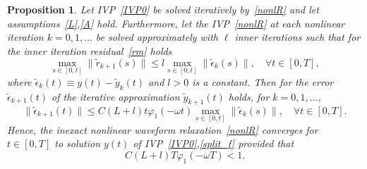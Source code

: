 \documentclass[sn-aps]{sn-jnl}
\theoremstyle{thmstyleone}%
\newtheorem{proposition}[theorem]{Proposition}%
\theoremstyle{thmstyletwo}%
\theoremstyle{thmstylethree}%
\newcommand{\leqs}{\leqslant}
\begin{document}
\begin{proposition}
\label{prop4}
Let IVP~\eqref{IVP0} be solved iteratively by~\eqref{nonlR} and let 
assumptions~\eqref{L},\eqref{A} hold.
Furthermore, let the IVP~\eqref{nonlR} at each nonlinear iteration $k=0,1,\dots$
be solved approximately with $\ell$ inner iterations such that for the inner iteration
residual~\eqref{rm} holds 
\begin{equation}
\label{rm_cond}
\max_{s\in[0,t]} \|\tilde{r}_{k+1}(s)\|\leqs
l \max_{s\in[0,t]} \|\tilde{\epsilon}_k(s)\|, \quad \forall t\in[0,T],
\end{equation} 
where $\tilde{\epsilon}_{k}(t)\equiv y(t) - \tilde{y}_{k}(t)$ and $l>0$ is a constant.
Then for the error $\tilde{\epsilon}_{k+1}(t)$  %
of the iterative approximation $\tilde{y}_{k+1}(t)$ holds, for $k=0,1,\dots$,
\begin{equation}
\label{est4}
\|\tilde{\epsilon}_{k+1}(t)\|\leqs C (L+l) t\varphi_1(-\omega t)
\max_{s\in[0,t]} \|\tilde{\epsilon}_k(s)\|, \quad \forall t\in[0,T].
\end{equation}
Hence, the inexact nonlinear waveform relaxation~\eqref{nonlR} converges for $t\in[0,T]$
to solution $y(t)$ of IVP~\eqref{IVP0},\eqref{split_f} provided that
\begin{equation}
\label{conv4}
C (L+l) T\varphi_1(-\omega T) <1.  
\end{equation}  
\end{proposition}
\end{document}
